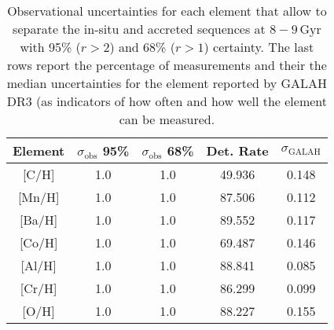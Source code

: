 \begin{table}
    \centering
    \caption{Observational uncertainties for each element that allow to separate the in-situ and accreted sequences at $8-9\,\mathrm{Gyr}$ with 95\% ($r>2$) and 68\% ($r>1$) certainty. The last rows report the percentage of measurements and their the median uncertainties for the element reported by GALAH DR3 (as indicators of how often and how well the element can be measured.}
    \begin{tabular}{ccccc}
    \hline
    Element & $\sigma_\text{obs}$ 95\% & $\sigma_\text{obs}$ 68\% & Det. Rate & $\sigma_\text{GALAH}$ \\
    \hline \hline
    {[C/H]}  & 1.0 & 1.0 & 49.936 & 0.148 \\
    {[Mn/H]}  & 1.0 & 1.0 & 87.506 & 0.112 \\
    {[Ba/H]}  & 1.0 & 1.0 & 89.552 & 0.117 \\
    {[Co/H]}  & 1.0 & 1.0 & 69.487 & 0.146 \\
    {[Al/H]}  & 1.0 & 1.0 & 88.841 & 0.085 \\
    {[Cr/H]}  & 1.0 & 1.0 & 86.299 & 0.099 \\
    {[O/H]}  & 1.0 & 1.0 & 88.227 & 0.155 \\
    \hline
    \end{tabular}
    \label{tab:r_values_simulation}
\end{table}
